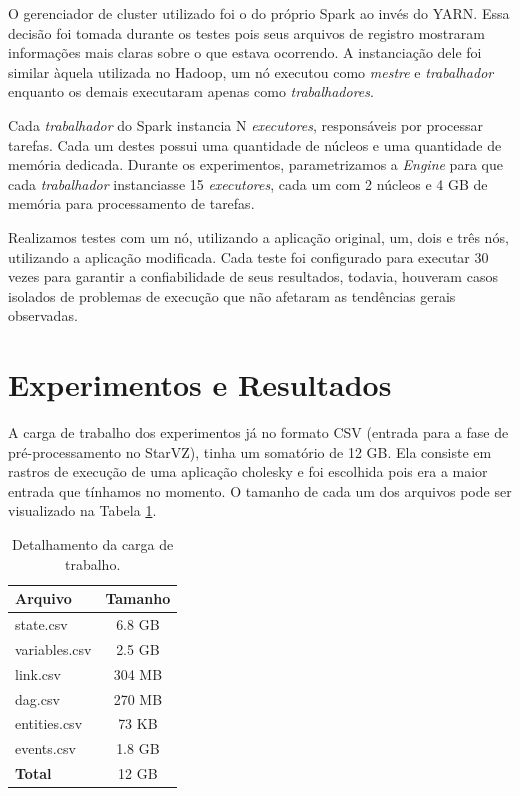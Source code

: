 O gerenciador de cluster utilizado foi o do próprio Spark ao invés do YARN. 
Essa decisão foi tomada durante os testes pois seus arquivos de registro 
mostraram informações mais claras sobre o que estava ocorrendo. A instanciação 
dele foi similar àquela utilizada no Hadoop, um nó executou como \emph{mestre} 
e \emph{trabalhador} enquanto os demais executaram apenas como 
\emph{trabalhadores}. 

Cada \emph{trabalhador} do Spark instancia N \emph{executores}, responsáveis 
por processar tarefas. Cada um destes possui uma quantidade de núcleos e uma 
quantidade de memória dedicada. Durante os experimentos, parametrizamos a 
\emph{Engine} para que cada \emph{trabalhador} instanciasse 15 
\emph{executores}, cada um com 2 núcleos e 4 GB de memória para 
processamento de tarefas.

Realizamos testes com um nó, utilizando a aplicação original, um, dois e três 
nós, utilizando a aplicação modificada. Cada teste foi configurado para 
executar 30 vezes para garantir a confiabilidade de seus resultados, todavia, 
houveram casos isolados de problemas de execução que não afetaram as tendências 
gerais observadas.


\section{Experimentos e Resultados} \label{sect:results}

A carga de trabalho dos experimentos já no formato CSV (entrada para a fase de 
pré-processamento no StarVZ), tinha um somatório de 12 GB. Ela consiste em 
rastros de execução de uma aplicação cholesky e foi escolhida pois era a maior
entrada que tínhamos no momento. O tamanho de cada um dos arquivos pode ser 
visualizado na Tabela \ref{tab:input_sz}.

\begin{table}[H]
\centering
\small
\begin{tabular}{l c} \toprule
\textbf{Arquivo}  &  \textbf{Tamanho} \\ 
\midrule
state.csv	& 6.8 GB \\
variables.csv  	& 2.5 GB \\
link.csv       	& 304 MB \\
dag.csv        	& 270 MB \\
entities.csv	& 73 KB \\
events.csv	& 1.8 GB \\
\textbf{Total}  & 12 GB  \\
\end{tabular}
\caption{Detalhamento da carga de trabalho.}
\label{tab:input_sz}
\end{table}

